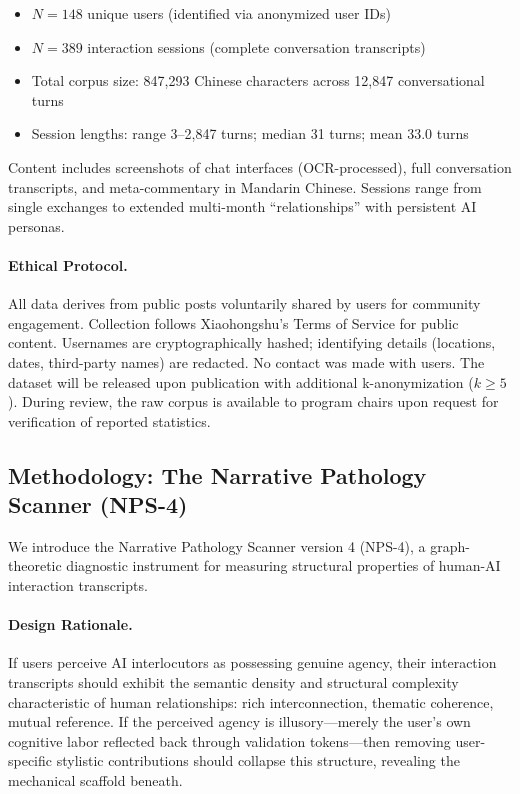 \documentclass[11pt, a4paper, oneside]{article}
\theoremstyle{analytic}
\begin{document}
\begin{itemize}
    \item $N = 148$ unique users (identified via anonymized user IDs)
    \item $N = 389$ interaction sessions (complete conversation transcripts)
    \item Total corpus size: 847,293 Chinese characters across 12,847 conversational turns
    \item Session lengths: range 3--2,847 turns; median 31 turns; mean 33.0 turns
\end{itemize}

Content includes screenshots of chat interfaces (OCR-processed), full conversation transcripts, and meta-commentary in Mandarin Chinese. Sessions range from single exchanges to extended multi-month ``relationships'' with persistent AI personas.

\paragraph{Ethical Protocol.}
All data derives from public posts voluntarily shared by users for community engagement. Collection follows Xiaohongshu's Terms of Service for public content. Usernames are cryptographically hashed; identifying details (locations, dates, third-party names) are redacted. No contact was made with users. The dataset will be released upon publication with additional k-anonymization ($k \geq 5$). During review, the raw corpus is available to program chairs upon request for verification of reported statistics.

\subsection{Methodology: The Narrative Pathology Scanner (NPS-4)}

We introduce the Narrative Pathology Scanner version 4 (NPS-4), a graph-theoretic diagnostic instrument for measuring structural properties of human-AI interaction transcripts.

\paragraph{Design Rationale.}
If users perceive AI interlocutors as possessing genuine agency, their interaction transcripts should exhibit the semantic density and structural complexity characteristic of human relationships: rich interconnection, thematic coherence, mutual reference. If the perceived agency is illusory---merely the user's own cognitive labor reflected back through validation tokens---then removing user-specific stylistic contributions should collapse this structure, revealing the mechanical scaffold beneath.
\end{document}
